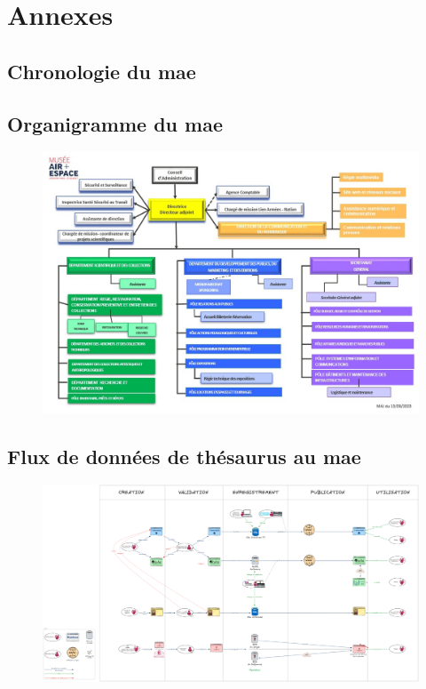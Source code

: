 \documentclass[12pt,twoside]{book}
\newcommand{\mae}{\ac{mae} }
\begin{document}
	\appendix %
	
	\part*{Annexes}
	
	\chapter[Chronologie du MAE]{\label{Ax-A}Chronologie du \mae}
	
	\chapter[Organigramme]{\label{Ax-B}Organigramme du \mae}
	\begin{figure}[htbp]
		\includegraphics[width=\linewidth]{img/SCHEM_organigramme.jpg}
		\label{fig:schem_organigramme}
	\end{figure}
	
	\chapter[Flux de données]{\label{Ax-C}Flux de données de thésaurus au \mae}
	\begin{figure}[htbp]
		\includegraphics[width=\textwidth]{img/MODEL_Flux.png}
		\label{fig:model_flux}
	\end{figure}
	
\end{document}
